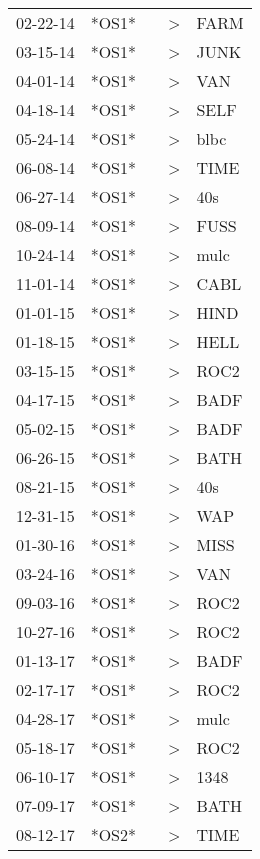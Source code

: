 \begin{supertabular}{lllll}
 02-22-14 &  *OS1* &   &  \textgreater &  FARM \\
 03-15-14 &  *OS1* &   &  \textgreater &  JUNK \\
 04-01-14 &  *OS1* &   &  \textgreater &   VAN \\
 04-18-14 &  *OS1* &   &  \textgreater &  SELF \\
 05-24-14 &  *OS1* &   &  \textgreater &  blbc \\
 06-08-14 &  *OS1* &   &  \textgreater &  TIME \\
 06-27-14 &  *OS1* &   &  \textgreater &   40s \\
 08-09-14 &  *OS1* &   &  \textgreater &  FUSS \\
 10-24-14 &  *OS1* &   &  \textgreater &  mulc \\
 11-01-14 &  *OS1* &   &  \textgreater &  CABL \\
 01-01-15 &  *OS1* &   &  \textgreater &  HIND \\
 01-18-15 &  *OS1* &   &  \textgreater &  HELL \\
 03-15-15 &  *OS1* &   &  \textgreater &  ROC2 \\
 04-17-15 &  *OS1* &   &  \textgreater &  BADF \\
 05-02-15 &  *OS1* &   &  \textgreater &  BADF \\
 06-26-15 &  *OS1* &   &  \textgreater &  BATH \\
 08-21-15 &  *OS1* &   &  \textgreater &   40s \\
 12-31-15 &  *OS1* &   &  \textgreater &   WAP \\
 01-30-16 &  *OS1* &   &  \textgreater &  MISS \\
 03-24-16 &  *OS1* &   &  \textgreater &   VAN \\
 09-03-16 &  *OS1* &   &  \textgreater &  ROC2 \\
 10-27-16 &  *OS1* &   &  \textgreater &  ROC2 \\
 01-13-17 &  *OS1* &   &  \textgreater &  BADF \\
 02-17-17 &  *OS1* &   &  \textgreater &  ROC2 \\
 04-28-17 &  *OS1* &   &  \textgreater &  mulc \\
 05-18-17 &  *OS1* &   &  \textgreater &  ROC2 \\
 06-10-17 &  *OS1* &   &  \textgreater &  1348 \\
 07-09-17 &  *OS1* &   &  \textgreater &  BATH \\
 08-12-17 &  *OS2* &   &  \textgreater &  TIME \\

\end{supertabular}
